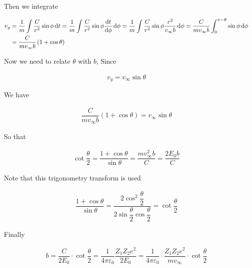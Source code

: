 Then we integrate

\begin{equation*}
  \begin{aligned}
    v_y &= \dfrac{1}{m} \int \dfrac{C}{r^2} \sin \phi \mathop{}\!\mathrm{d} t
    = \dfrac{1}{m} \int \dfrac{C}{r^2} \sin \phi \dfrac{\mathop{}\!\mathrm{d} t}{\mathop{}\!\mathrm{d} \phi} \mathop{}\!\mathrm{d} \phi 
    = \dfrac{1}{m} \int \dfrac{C}{r^2} \sin \phi \dfrac{r^2}{v_{\infty} b}  \mathop{}\!\mathrm{d} \phi
    = \dfrac{C}{m v_{\infty} b} \int_0^{\pi - \theta} \sin \phi \mathop{}\!\mathrm{d} \phi\\
    &= \dfrac{C}{m v_{\infty} b} \left( 1 + \cos \theta \right) 
  \end{aligned}
\end{equation*}

Now we need to relate $\theta$ with $b$, Since

\begin{equation*}
  \begin{aligned}
    v_y = v_\infty \sin \theta
  \end{aligned}
\end{equation*}

We have

\begin{equation*}
  \begin{aligned}
    \dfrac{C}{m v_{\infty} b} \left( 1 + \cos \theta \right) = v_{\infty} \sin \theta
  \end{aligned}
\end{equation*}

So that

\begin{equation*}
  \begin{aligned}
    \cot \dfrac{\theta}{2} = \dfrac{1 + \cos \theta}{\sin \theta} = \dfrac{m v_{\infty}^2 b}{C} = \dfrac{2 E_0 b}{C} 
  \end{aligned}
\end{equation*}

Note that this trigonometry transform is used

\begin{equation*}
  \begin{aligned}
    \dfrac{1 + \cos \theta}{\sin \theta} = \dfrac{2 \cos^2 \dfrac{\theta}{2}}{2 \sin \dfrac{\theta}{2} \cos \dfrac{\theta}{2}} = \cot \dfrac{\theta}{2}
  \end{aligned}
\end{equation*}

Finally

\begin{equation*}
  \begin{aligned}
    b = \dfrac{C}{2 E_0} \cdot \cot \dfrac{\theta}{2} = \dfrac{1}{4 \pi \varepsilon_0} \dfrac{Z_1 Z_2 e^2}{2 E_0} = \dfrac{1}{4 \pi \varepsilon_0} \cdot \dfrac{Z_1 Z_2 e^2}{m v_{\infty}} \cdot \cot \dfrac{\theta}{2} 
  \end{aligned}
\end{equation*}

